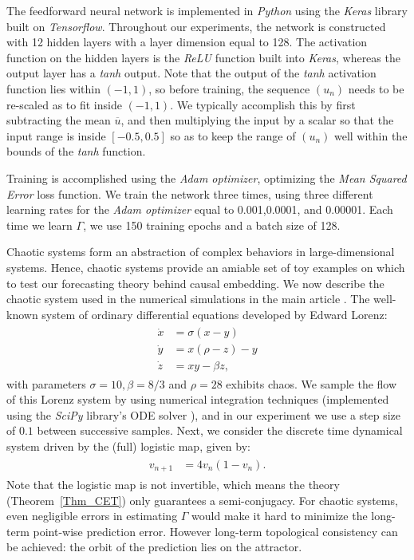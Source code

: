 \documentclass[12 pt]{article}
\begin{document}
The feedforward neural network is implemented in {\it Python} using the {\it Keras} \cite{chollet2015keras} library built on {\it Tensorflow}. 
Throughout our experiments, the network is constructed with 12 hidden layers with a layer dimension equal to 128. The activation function on the hidden layers is the {\it ReLU } function built into {\it Keras}, whereas the output layer has a {\it tanh} output. Note that the output of the {\it tanh} activation function lies within $(-1,1)$, so before training, the sequence $(u_n)$ needs to be re-scaled as to fit inside $(-1,1)$. We typically accomplish this by first subtracting the mean $\overline{u}$, and then multiplying the input by a scalar so that the input range is inside $[-0.5,0.5]$ so as to keep the range of $(u_n)$ well within the bounds of the {\it tanh} function.

Training is accomplished using the {\it Adam optimizer}, optimizing the {\it Mean Squared Error} loss function. We train the network three times, using three different learning rates for the {\it Adam optimizer} equal to 0.001,0.0001, and 0.00001. Each time we learn $\Gamma$, we use 150 training epochs and a batch size of 128. 


 Chaotic systems form an abstraction of complex behaviors in large-dimensional systems. Hence, chaotic systems provide an amiable set of toy examples on which to test our forecasting theory behind causal embedding. We now describe the chaotic system used in the numerical simulations in the main article \cite{Main_article}. The well-known system of ordinary differential equations developed by Edward Lorenz:
\begin{align} 
\label{Seq_Lor}
\begin{split}
    \dot{x} &= \sigma(x-y) \\
    \dot{y} &= x(\rho -z) -y \\
    \dot{z} &= xy - \beta z,    
\end{split}
\end{align}
with parameters $\sigma=10, \beta=8/3$ and $\rho=28$ exhibits chaos.  We sample the flow of this Lorenz system by using numerical integration techniques (implemented using the {\it SciPy} library's ODE solver \cite{2020SciPy-NMeth}), and in our experiment we use a step size of $0.1$ between successive samples.   Next, we consider the discrete time dynamical system driven by the (full) logistic map, given by: 
\begin{align}
    \begin{split}
        \label{Seq_log}
         v_{n+1} &= 4v_n(1-v_n).
    \end{split}
\end{align}
Note that the logistic map is not invertible, which means the theory (Theorem~\ref{Thm_CET}) only guarantees a semi-conjugacy.
For chaotic systems, even negligible errors in estimating $\Gamma$ would make it hard to minimize the long-term point-wise prediction error. However long-term topological consistency can be achieved: the orbit of the prediction lies on the attractor.  
\end{document}

